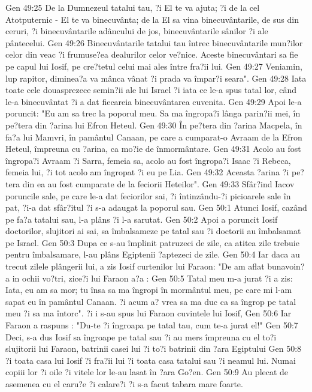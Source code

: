 Gen 49:25  De la Dumnezeul tatalui tau, ?i El te va ajuta; ?i de la cel Atotputernic - El te va binecuvânta; de la El sa vina binecuvântarile, de sus din ceruri, ?i binecuvântarile adâncului de jos, binecuvântarile sânilor ?i ale pântecelui.
Gen 49:26  Binecuvântarile tatalui tau întrec binecuvântarile mun?ilor celor din veac ?i frumuse?ea dealurilor celor ve?nice. Aceste binecuvântari sa fie pe capul lui Iosif, pe cre?tetul celui mai ales între fra?ii lui.
Gen 49:27  Veniamin, lup rapitor, diminea?a va mânca vânat ?i prada va împar?i seara".
Gen 49:28  Iata toate cele douasprezece semin?ii ale lui Israel ?i iata ce le-a spus tatal lor, când le-a binecuvântat ?i a dat fiecareia binecuvântarea cuvenita.
Gen 49:29  Apoi le-a poruncit: "Eu am sa trec la poporul meu. Sa ma îngropa?i lânga parin?ii mei, în pe?tera din ?arina lui Efron Heteul.
Gen 49:30  În pe?tera din ?arina Macpela, în fa?a lui Mamvri, în pamântul Canaan, pe care a cumparat-o Avraam de la Efron Heteul, împreuna cu ?arina, ca mo?ie de înmormântare.
Gen 49:31  Acolo au fost îngropa?i Avraam ?i Sarra, femeia sa, acolo au fost îngropa?i Isaac ?i Rebeca, femeia lui, ?i tot acolo am îngropat ?i eu pe Lia.
Gen 49:32  Aceasta ?arina ?i pe?tera din ea au fost cumparate de la feciorii Heteilor".
Gen 49:33  Sfâr?ind Iacov poruncile sale, pe care le-a dat feciorilor sai, ?i întinzându-?i picioarele sale în pat, ?i-a dat sfâr?itul ?i s-a adaugat la poporul sau.
Gen 50:1  Atunci Iosif, cazând pe fa?a tatalui sau, l-a plâns ?i l-a sarutat.
Gen 50:2  Apoi a poruncit Iosif doctorilor, slujitori ai sai, sa îmbalsameze pe tatal sau ?i doctorii au îmbalsamat pe Israel.
Gen 50:3  Dupa ce s-au împlinit patruzeci de zile, ca atitea zile trebuie pentru îmbalsamare, l-au plâns Egiptenii ?aptezeci de zile.
Gen 50:4  Iar daca au trecut zilele plângerii lui, a zis Iosif curtenilor lui Faraon: "De am aflat bunavoin?a in ochii vo?tri, zice?i lui Faraon a?a :
Gen 50:5  Tatal meu m-a jurat ?i a zis: Iata, eu am sa mor; tu însa sa ma îngropi în mormântul meu, pe care mi l-am sapat eu în pamântul Canaan. ?i acum a? vrea sa ma duc ca sa îngrop pe tatal meu ?i sa ma întorc". ?i i s-au spus lui Faraon cuvintele lui Iosif,
Gen 50:6  Iar Faraon a raspuns : "Du-te ?i îngroapa pe tatal tau, cum te-a jurat el!"
Gen 50:7  Deci, s-a dus Iosif sa îngroape pe tatal sau ?i au mers împreuna cu el to?i slujitorii lui Faraon, batrinii casei lui ?i to?i batrinii din ?ara Egiptului
Gen 50:8  ?i toata casa lui Iosif ?i fra?ii lui ?i toata casa tatalui sau ?i neamul lui. Numai copiii lor ?i oile ?i vitele lor le-au lasat în ?ara Go?en.
Gen 50:9  Au plecat de asemenea cu el caru?e ?i calare?i ?i s-a facut tabara mare foarte.
